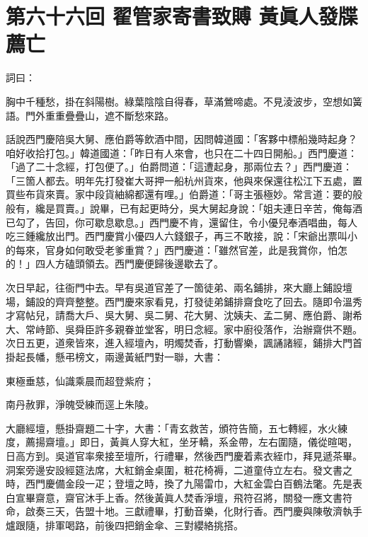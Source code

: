 
\chapter*{第六十六回 翟管家寄書致賻 黃眞人發牒薦亡}


詞曰：

\begin{myquote} 
胸中千種愁，掛在斜陽樹。綠葉陰陰自得春，草滿鶯啼處。不見淩波步，空想如簧語。門外重重疊疊山，遮不斷愁來路。

\end{myquote} 

話說西門慶陪吳大舅、應伯爵等飲酒中間，因問韓道國：「客夥中標船幾時起身？咱好收拾打包。」韓道國道：「昨日有人來會，也只在二十四日開船。」西門慶道：「過了二十念經，打包便了。」伯爵問道：「這遭起身，那兩位去？」西門慶道：「三箇人都去。明年先打發崔大哥押一船杭州貨來，他與來保還往松江下五處，置買些布貨來賣。家中段貨紬綿都還有哩。」{}伯爵道：「哥主張極妙。常言道：要的般般有，纔是買賣。」說畢，已有起更時分，吳大舅起身說：「姐夫連日辛苦，俺每酒已勾了，告回，你可歇息歇息。」西門慶不肯，還留住，令小優兒奉酒唱曲，每人吃三鍾纔放出門。西門慶賞小優四人六錢銀子，再三不敢接，說：「宋爺出票叫小的每來，官身如何敢受老爹重賞？」西門慶道：「雖然官差，此是我賞你，怕怎的！」四人方磕頭領去。西門慶便歸後邊歇去了。

次日早起，往衙門中去。早有吳道官差了一箇徒弟、兩名鋪排，來大廳上鋪設壇場，鋪設的齊齊整整。西門慶來家看見，打發徒弟鋪排齋食吃了回去。隨即令溫秀才寫帖兒，請喬大戶、吳大舅、吳二舅、花大舅、沈姨夫、孟二舅、應伯爵、謝希大、常峙節、吳舜臣許多親眷並堂客，明日念經。家中廚役落作，治辦齋供不題。次日五更，道衆皆來，進入經壇內，明燭焚香，打動響樂，諷誦諸經，鋪排大門首掛起長幡，懸弔榜文，兩邊黃紙門對一聯，大書：

\begin{myquote} 
東極垂慈，仙識乘晨而超登紫府；

南丹赦罪，淨魄受練而逕上朱陵。
\end{myquote} 

大廳經壇，懸掛齋題二十字，大書：「青玄救苦，頒符告簡，五七轉經，水火練度，薦揚齋壇。」即日，黃眞人穿大紅，坐牙轎，系金帶，左右圍隨，儀從暄喝，日高方到。吳道官率衆接至壇所，行禮畢，然後西門慶着素衣絰巾，拜見遞茶畢。洞案旁邊安設經筵法席，大紅銷金桌圍，粧花椅褥，二道童侍立左右。發文書之時，西門慶備金段一疋；登壇之時，換了九陽雷巾，大紅金雲白百鶴法氅。先是表白宣畢齋意，齋官沐手上香。然後黃眞人焚香淨壇，飛符召將，關發一應文書符命，啟奏三天，告盟十地。三獻禮畢，打動音樂，化財行香。西門慶與陳敬濟執手爐跟隨，排軍喝路，前後四把銷金傘、三對纓絡挑搭。


